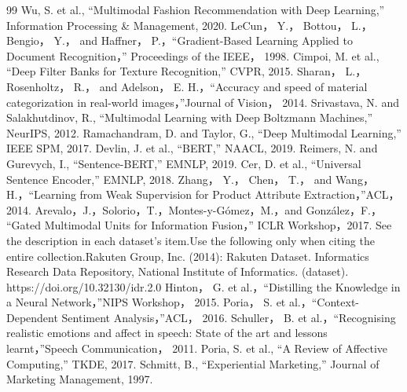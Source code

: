 \documentclass[a4paper,12pt]{jreport}
\begin{document}
\begin{thebibliography}{99}
%
 Wu, S. et al., “Multimodal Fashion Recommendation with Deep Learning,” Information Processing \& Management, 2020.
%
LeCun， Y.， Bottou， L.， Bengio， Y.， and Haffner， P.，“Gradient-Based Learning Applied to Document Recognition，” Proceedings of the IEEE， 1998.
%
Cimpoi, M. et al., “Deep Filter Banks for Texture Recognition,” CVPR, 2015.
Sharan， L.， Rosenholtz， R.， and Adelson， E. H.，“Accuracy and speed of material categorization in real-world images，”Journal of Vision， 2014.
%
Srivastava, N. and Salakhutdinov, R., “Multimodal Learning with Deep Boltzmann Machines,” NeurIPS, 2012.
%
Ramachandram, D. and Taylor, G., “Deep Multimodal Learning,” IEEE SPM, 2017.
%
Devlin, J. et al., “BERT,” NAACL, 2019.
%
Reimers, N. and Gurevych, I., “Sentence-BERT,” EMNLP, 2019.
%
Cer, D. et al., “Universal Sentence Encoder,” EMNLP, 2018.
%
Zhang， Y.， Chen， T.， and Wang， H.，“Learning from Weak Supervision for Product Attribute Extraction，”ACL， 2014.
%
Arevalo，J.，Solorio，T.，Montes-y-Gómez，M.，and González，F.，
“Gated Multimodal Units for Information Fusion，”
ICLR Workshop，2017.
%
See the description in each dataset's item.Use the following only when citing the entire collection.Rakuten Group, Inc. (2014): Rakuten Dataset. Informatics Research Data Repository, National Institute of Informatics. (dataset). https://doi.org/10.32130/idr.2.0
%
Hinton， G. et al.，“Distilling the Knowledge in a Neural Network，”NIPS Workshop， 2015.
%
Poria， S. et al.，“Context-Dependent Sentiment Analysis，”ACL， 2016.
%
Schuller， B. et al.，“Recognising realistic emotions and affect in speech: State of the art and lessons learnt，”Speech Communication， 2011.
%
Poria, S. et al., “A Review of Affective Computing,” TKDE, 2017.
%
Schmitt, B., “Experiential Marketing,” Journal of Marketing Management, 1997.
%




\end{thebibliography}
%
\end{document}
